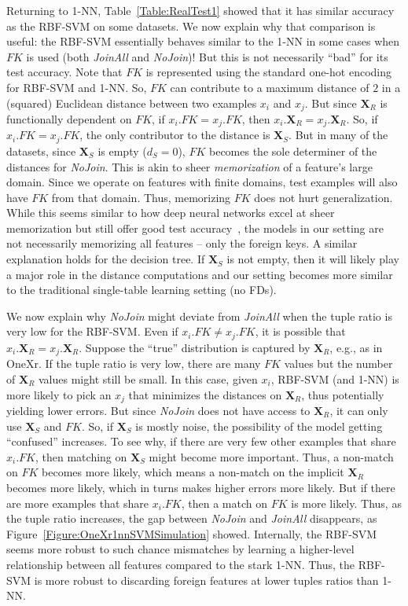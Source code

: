 \documentclass{vldb}
\begin{document}
Returning to 1-NN, Table~\ref{Table:RealTest1} showed that it has similar accuracy as the RBF-SVM on some datasets. We now explain why that comparison is useful: the RBF-SVM 
essentially behaves similar to the 1-NN in some cases when $FK$ is used (both \textit{JoinAll} and \textit{NoJoin})! But this is not necessarily ``bad'' for its test accuracy.
Note that $FK$ is represented using the standard one-hot encoding for RBF-SVM and 1-NN. So, $FK$ can contribute to a maximum distance of $2$ in a (squared) Euclidean distance between 
two examples $x_i$ and $x_j$.
But since $\textbf{X}_R$ is functionally dependent on $FK$, if $x_i.FK = x_j.FK$, then $x_i.\textbf{X}_R = x_j.\textbf{X}_R$. So, if $x_i.FK = x_j.FK$, the only contributor to 
the distance is $\textbf{X}_S$. But in many of the datasets, since $\textbf{X}_S$ is empty ($d_S = 0$), $FK$ becomes the sole determiner of the distances for \textit{NoJoin}.
This is akin to sheer \textit{memorization} of a feature's large domain. Since we operate on features with finite domains, test examples will also have $FK$ from that domain. 
Thus, memorizing $FK$ does not hurt generalization. While this seems similar to how deep neural networks excel at sheer memorization but still offer good test accuracy~\cite{rechtdnn}, 
the models in our setting are not necessarily memorizing all features -- only the foreign keys.
A similar explanation holds for the decision tree. If $\textbf{X}_S$ is not empty, then it will likely play a major role in the distance computations and our setting 
becomes more similar to the traditional single-table learning setting (no FDs).

We now explain why \textit{NoJoin} might deviate from \textit{JoinAll} when the tuple ratio is very low for the RBF-SVM. Even if $x_i.FK \ne x_j.FK$, it is possible that 
$x_i.\textbf{X}_R = x_j.\textbf{X}_R$. Suppose the ``true'' distribution is captured by $\textbf{X}_R$, e.g., as in OneXr. 
If the tuple ratio is very low, there are many $FK$ values but the number of $\textbf{X}_R$ values might still be small. In this case, given $x_i$, RBF-SVM (and 1-NN) is more 
likely to pick an $x_j$ that minimizes the distances on $\textbf{X}_R$, thus potentially yielding lower errors. But since \textit{NoJoin} does not have access to 
$\textbf{X}_R$, it can only use $\textbf{X}_S$ and $FK$. So, if $\textbf{X}_S$ is mostly noise, the possibility of the model getting ``confused'' 
increases. To see why, if there are very few other examples that share $x_i.FK$, then matching on $\textbf{X}_S$ might become more important. 
Thus, a non-match on $FK$ becomes more likely, which means a non-match on the implicit $\textbf{X}_R$ becomes more likely, which in turns makes higher errors more likely. 
But if there are more examples that share $x_i.FK$, then a match on $FK$ is more likely. Thus, as the tuple ratio increases, the gap between \textit{NoJoin} 
and \textit{JoinAll} disappears, as Figure~\ref{Figure:OneXr1nnSVMSimulation} showed. Internally, the RBF-SVM seems more robust to such chance mismatches by learning a higher-level 
relationship between all features compared to the stark 1-NN. Thus, the RBF-SVM is more robust to discarding foreign features at lower tuples ratios than 1-NN.
\end{document}
